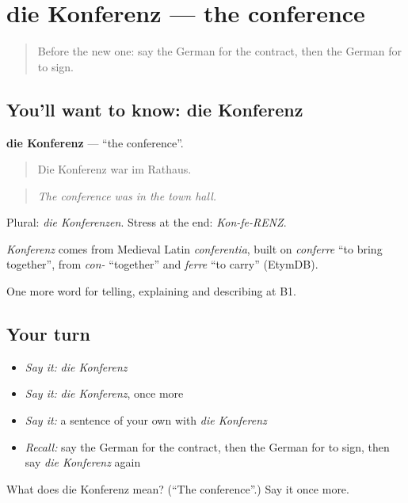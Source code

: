 \section[die Konferenz]{die Konferenz — the conference}

\label{lesson:GE-C278-konferenz}



\begin{quote}
Before the new one: say the German for the contract, then the German for to sign.
\end{quote}

\subsection*{You'll want to know: die Konferenz}
\textbf{die Konferenz} — \textquotedblleft{}the conference\textquotedblright{}.

\begin{quote}
Die Konferenz war im Rathaus.
\end{quote}

\begin{quote}
\emph{The conference was in the town hall.}
\end{quote}

Plural: \emph{die Konferenzen}. Stress at the end: \emph{Kon-fe-RENZ}.

\begin{cousinweb}
\emph{Konferenz} comes from Medieval Latin \emph{conferentia}, built on \emph{conferre} \textquotedblleft{}to bring together\textquotedblright{}, from \emph{con-} \textquotedblleft{}together\textquotedblright{} and \emph{ferre} \textquotedblleft{}to carry\textquotedblright{} (EtymDB).
\end{cousinweb}

\begin{grammarlens}[title={What you've built}]
One more word for telling, explaining and describing at B1.
\end{grammarlens}

\subsection*{Your turn}
\begin{itemize}
\raggedright
  \item \emph{Say it:} \emph{die Konferenz}
  \item \emph{Say it:} \emph{die Konferenz}, once more
  \item \emph{Say it:} a sentence of your own with \emph{die Konferenz}
  \item \emph{Recall:} say the German for the contract, then the German for to sign, then say \emph{die Konferenz} again
\end{itemize}

\begin{tcolorbox}[breakable,colback=teal!4,colframe=teal!35!black,title={Before you move on}]
What does die Konferenz mean? (\textquotedblleft{}The conference\textquotedblright{}.) Say it once more.
\end{tcolorbox}
